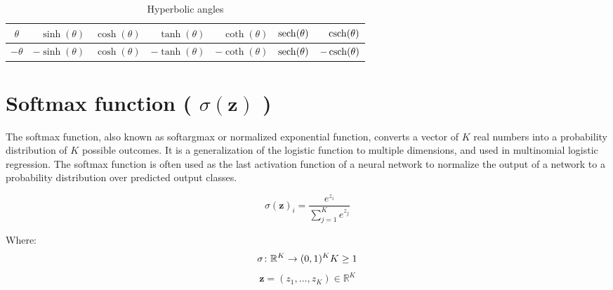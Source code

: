 \begin{table}[H]
    \centering
    \begin{tabular}{|c|r|r|r|r|r|r|}
        \hline
        $\theta$ & $\sinh(\theta)$ & $\cosh(\theta)$ & $\tanh(\theta)$ & $\coth(\theta)$ & $\operatorname{sech}(\theta)$ & $\operatorname{csch}(\theta)$ \\ \hline

        $-\theta$ & $-\sinh(\theta)$ & $\cosh(\theta)$ & $-\tanh(\theta)$ & $-\coth(\theta)$ & $\operatorname{sech}(\theta)$ & $-\operatorname{csch}(\theta)$ \\ \hline
    \end{tabular}
    \caption{Hyperbolic angles}
\end{table}

\section{Softmax function ( $\sigma (\mathbf {z})$ ) \cite{wiki-softmax-function}}\label{Softmax function}
The softmax function, also known as softargmax or normalized exponential function, converts a vector of $K$ real numbers into a probability distribution of $K$ possible outcomes. It is a generalization of the logistic function to multiple dimensions, and used in multinomial logistic regression. The softmax function is often used as the last activation function of a neural network to normalize the output of a network to a probability distribution over predicted output classes.

\[
    {\displaystyle \sigma (\mathbf {z} )_{i}={\displaystyle\frac {e^{z_{i}}}{\sum _{j=1}^{K}e^{z_{j}}}}}
\]

Where:
\[
    {\displaystyle \sigma \colon \mathbb {R} ^{K}\to (0,1)^{K}}
    \hfill
    {\displaystyle K\geq 1}
\]
\[
    {\displaystyle \mathbf {z} =(z_{1},\dotsc ,z_{K})\in \mathbb {R} ^{K}}
\]






















































